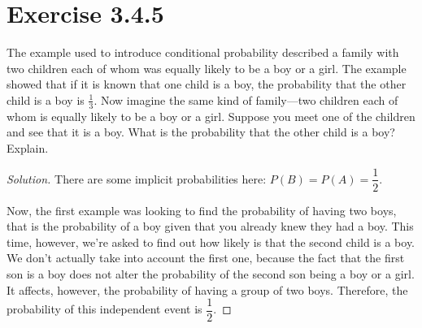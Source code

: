\documentclass[titlepage, letterpaper, fleqn]{article}
\renewcommand\qedsymbol{\(\blacksquare\)}
\newenvironment{solution}
{\renewcommand\qedsymbol{$\square$}\begin{proof}[Solution]}
{\end{proof}}
\begin{document}
\section{Exercise 3.4.5}

{\large The example used to introduce conditional probability described a family with two children each of whom was equally likely to be a boy or a girl.
The example showed that if it is known that one child is a boy,
the probability that the other child is a boy is \(\frac{1}{3}\).
Now imagine the same kind of family—two children each of whom is equally likely to be a boy or a girl.
Suppose you meet one of the children and see that it is a boy.
What is the probability that the other child is a boy? Explain}.

\begin{solution}
There are some implicit probabilities here: \(P(B) = P(A) = \dfrac{1}{2}\).

Now, the first example was looking to find the probability of having two boys, that is the probability of a boy given that you already knew they had a boy.
This time, however, we're asked to find out how likely is that the second child is a boy. We don't actually take into account the first one, because the fact that the first son is a boy does not alter the probability of the second son being a boy or a girl.
It affects, however, the probability of having a group of two boys.
Therefore, the probability of this independent event is \(\dfrac{1}{2}\).
\end{solution}
\end{document}
